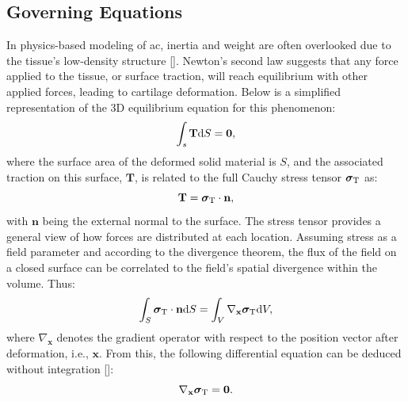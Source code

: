 \documentclass[12pt,a4paper]{report}
\begin{document}
\subsection{Governing Equations}
In physics-based modeling of \ac{ac}, inertia and weight are often overlooked due to the tissue's low-density structure [\cite{pearle2005}]. Newton's second law suggests that any force applied to the tissue, or surface traction, will reach equilibrium with other applied forces, leading to cartilage deformation. Below is a simplified representation of the 3D equilibrium equation for this phenomenon:
%
\begin{equation}
    \int_s \mathbf{T} {\rm d}S = \mathbf{0},
\end{equation}
%
where the surface area of the deformed solid material is $S$, and the associated traction on this surface, $\mathbf{T}$, is related to the full Cauchy stress tensor $\boldsymbol{\sigma}_{\rm T}$ as:
%
\begin{equation}\label{eq-traction}
    \mathbf{T} = \boldsymbol{\sigma}_{\rm T} \cdot \textbf{n},
\end{equation}
%
with $\textbf{n}$ being the external normal to the surface. The stress tensor provides a general view of how forces are distributed at each location. Assuming stress as a field parameter and according to the divergence theorem, the flux of the field on a closed surface can be correlated to the field's spatial divergence within the volume. Thus:
%
\begin{equation}
    \int_S \boldsymbol{\sigma}_{\rm T} \cdot \textbf{n} {\rm d}S = \int_V \nabla_\textbf{x} \boldsymbol{\sigma}_{\rm T} {\rm d}V,
\end{equation}
%
where $\nabla_\textbf{x}$ denotes the gradient operator with respect to the position vector after deformation, i.e., $\textbf{x}$. From this, the following differential equation can be deduced without integration [\cite{gerhard-book}]:
%
\begin{equation}\label{eq-strong}
    \nabla_\textbf{x} \boldsymbol{\sigma}_{\rm T} = \textbf{0}.
\end{equation}
\end{document}
